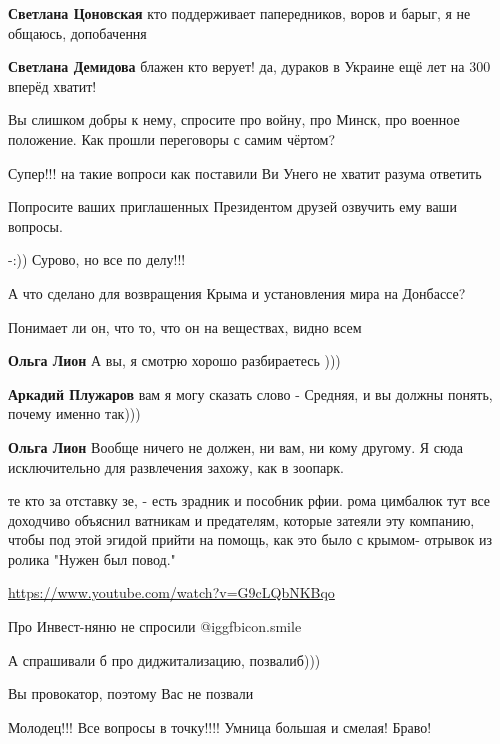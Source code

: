 \begin{itemize}
\begin{itemize}
\textbf{Светлана Цоновская} кто поддерживает папередников, воров и барыг, я не общаюсь, допобачення

\textbf{Светлана Демидова} блажен кто верует! да, дураков в Украине ещё лет на 300 вперёд хватит!
\end{itemize} %

Вы слишком добры к нему, спросите про войну, про Минск, про военное положение. Как прошли переговоры с самим чёртом?

Супер!!!
на такие вопроси как поставили Ви
Унего не хватит разума ответить

Попросите ваших приглашенных Президентом друзей озвучить ему ваши вопросы.

-:)) Сурово, но все по делу!!!

А что сделано для возвращения Крыма и установления мира на Донбассе?

Понимает ли он, что то, что он на веществах, видно всем

\begin{itemize} %
\textbf{Ольга Лион} А вы, я смотрю хорошо разбираетесь )))

\textbf{Аркадий Плужаров} вам я могу сказать слово - Средняя, и вы должны понять, почему именно так)))

\textbf{Ольга Лион} Вообще ничего не должен, ни вам, ни кому другому. Я сюда исключительно для развлечения захожу, как в зоопарк.
\end{itemize} %


те кто за отставку зе, - есть зрадник и пособник рфии. рома цимбалюк тут все
доходчиво объяснил ватникам и предателям, которые затеяли эту компанию, чтобы
под этой эгидой прийти на помощь, как это было с крымом- отрывок из ролика
"Нужен был повод." 

\url{https://www.youtube.com/watch?v=G9cLQbNKBqo}

Про Инвест-няню не спросили  @igg{fbicon.smile} 

А спрашивали б про диджитализацию, позвалиб)))

Вы провокатор, поэтому Вас не позвали

Молодец!!! Все вопросы в точку!!!! Умница большая и смелая! Браво!


\end{itemize}
